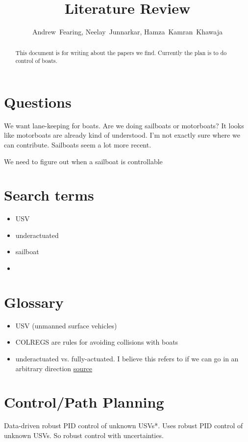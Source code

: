 \documentclass[conference]{IEEEtran}
\begin{document}
\title{Literature Review}
\author{Andrew~Fearing, Neelay~Junnarkar,  Hamza~Kamran~Khawaja}
\maketitle

\begin{abstract}
This document is for writing about the papers we find. Currently the plan is to do control of boats.
\end{abstract}

\section{Questions}
We want lane-keeping for boats. Are we doing sailboats or motorboats? It looks like motorboats are already kind of understood. I'm not exactly sure where we can contribute. Sailboats seem a lot more recent.

We need to figure out when a sailboat is controllable
\section{Search terms}
\begin{itemize}
    \item USV
    \item underactuated
    \item sailboat
    \item 
\end{itemize}
\section{Glossary}
\begin{itemize}
    \item USV (unmanned surface vehicles)
    \item COLREGS are rules for avoiding collisions with boats
    \item underactuated vs. fully-actuated. I believe this refers to if we can go in an arbitrary direction  \href{https://ocw.mit.edu/courses/electrical-engineering-and-computer-science/6-832-underactuated-robotics-spring-2009/readings/MIT6_832s09_read_ch01.pdf}{source}
\end{itemize}

\section{Control/Path Planning}
\cite{Nan2020} Data-driven robust PID control of unknown USVs*. Uses robust PID control of unknown USVs. So robust control with uncertainties.
\end{document}

